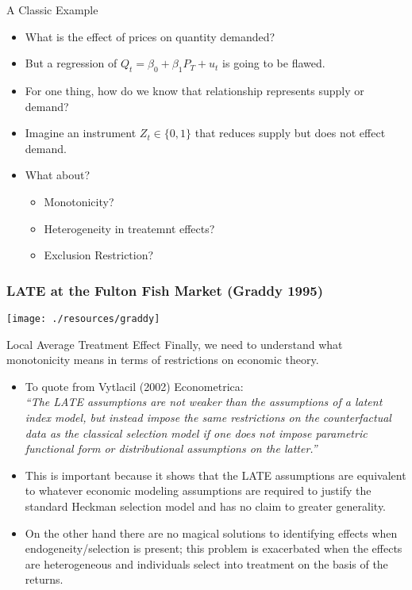 \documentclass[xcolor=pdftex,dvipsnames,table,mathserif,aspectratio=169]{beamer}
\begin{document}
\begin{frame}{A Classic Example}
\begin{itemize}
\item What is the effect of prices on quantity demanded?
\item But a regression of $Q_t  = \beta_0 + \beta_1 P_T + u_t$ is going to be flawed.
\item For one thing, how do we know that relationship represents supply or demand?
\item Imagine an instrument $Z_t \in \{0,1\}$ that reduces supply but does not effect demand.
\item What about?
\begin{itemize}
\item Monotonicity?
\item Heterogeneity in treatemnt effects?
\item Exclusion Restriction?
\end{itemize}
\end{itemize}
\end{frame}


\begin{frame}
\frametitle{LATE at the Fulton Fish Market (Graddy 1995)}

\begin{center}
\texttt{[image: ./resources/graddy]}
\end{center}

\end{frame}





\begin{frame}{Local Average Treatment Effect}
Finally, we need to understand what monotonicity means in terms of restrictions on economic theory. 
\begin{itemize}
\item To quote from Vytlacil (2002) Econometrica:\\
\emph{ ``The LATE assumptions are not weaker than the assumptions of a latent index model, but instead impose the same restrictions on the counterfactual data as the classical selection model if one does not impose parametric functional form or distributional assumptions on the latter.''}
\item This is important because it shows that the LATE assumptions are equivalent to whatever economic modeling assumptions are required to justify the standard Heckman selection model and has no claim to greater generality.
\item On the other hand there are no magical solutions to identifying effects when endogeneity/selection is present; this problem is exacerbated when the effects are heterogeneous and individuals select into treatment on the basis of the returns.
\end{itemize}
\end{frame}
\end{document}
